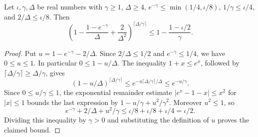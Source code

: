 \begin{lemma}
Let $\iota,\gamma,\Delta$ be real numbers with $\gamma\ge1$, $\Delta\ge4$,
$e^{-\gamma}\le\min(1/4,\iota/8)$, $1/\gamma\le\iota/4$, and
$2/\Delta\le\iota/8$. Then
\[
\left(1-\frac{1-e^{-\gamma}}\Delta+\frac2{\Delta^2}\right)^{\lceil\Delta/\gamma\rceil}
\le 1-\frac{1-\iota/2}{\gamma}.
\]
\end{lemma}
\begin{proof}
Put $u=1-e^{-\gamma}-2/\Delta$. Since $2/\Delta\le1/2$ and
$e^{-\gamma}\le1/4$, we have $0\le u\le1$. In particular
$0\le1-u/\Delta$. The inequality $1+x\le e^x$, followed by
$\lceil\Delta/\gamma\rceil\ge\Delta/\gamma$, gives
\[
(1-u/\Delta)^{\lceil\Delta/\gamma\rceil}
\le e^{-u\lceil\Delta/\gamma\rceil/\Delta}\le e^{-u/\gamma}.
\]
Since $0\le u/\gamma\le1$, the exponential remainder estimate
$|e^x-1-x|\le x^2$ for $|x|\le1$ bounds the last expression by
$1-u/\gamma+u^2/\gamma^2$. Moreover $u^2\le1$, so
\[
e^{-\gamma}+2/\Delta+u^2/\gamma
\le \iota/8+\iota/8+\iota/4=\iota/2.
\]
Dividing this inequality by $\gamma>0$ and substituting the definition
of $u$ proves the claimed bound.
\end{proof}
